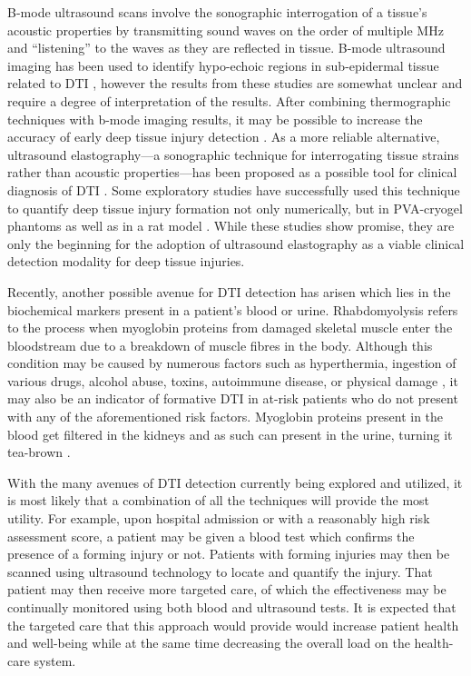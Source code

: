 			B-mode ultrasound scans involve the sonographic interrogation of a tissue's acoustic properties by transmitting sound waves on the order of multiple \si{MHz} and ``listening'' to the waves as they are reflected in tissue. B-mode ultrasound imaging has been used to identify hypo-echoic regions in sub-epidermal tissue related to DTI \cite{andersen08,aoi08,kanno09}, however the results from these studies are somewhat unclear and require a degree of interpretation of the results. After combining thermographic techniques with b-mode imaging results, it may be possible to increase the accuracy of early deep tissue injury detection \cite{higashino12}. As a more reliable alternative, ultrasound elastography---a sonographic technique for interrogating tissue strains rather than acoustic properties---has been proposed as a possible tool for clinical diagnosis of DTI \cite{gehin06,gefen09,gefen13}. Some exploratory studies have successfully used this technique to quantify deep tissue injury formation not only numerically, but in {PVA}-cryogel phantoms as well as in a rat model \cite{deprez07,deprez11}. While these studies show promise, they are only the beginning for the adoption of ultrasound elastography as a viable clinical detection modality for deep tissue injuries.

			Recently, another possible avenue for DTI detection has arisen which lies in the biochemical markers present in a patient's blood or urine. Rhabdomyolysis refers to the process when myoglobin proteins from damaged skeletal muscle enter the bloodstream due to a breakdown of muscle fibres in the body. Although this condition may be caused by numerous factors such as hyperthermia, ingestion of various drugs, alcohol abuse, toxins, autoimmune disease, or physical damage \cite{beetham00,sauret02}, it may also be an indicator of formative DTI in at-risk patients who do not present with any of the aforementioned risk factors. Myoglobin proteins present in the blood get filtered in the kidneys and as such can present in the urine, turning it tea-brown \cite{bagley07}.

			With the many avenues of DTI detection currently being explored and utilized, it is most likely that a combination of all the techniques will provide the most utility. For example, upon hospital admission or with a reasonably high risk assessment score, a patient may be given a blood test which confirms the presence of a forming injury or not. Patients with forming injuries may then be scanned using ultrasound technology to locate and quantify the injury. That patient may then receive more targeted care, of which the effectiveness may be continually monitored using both blood and ultrasound tests. It is expected that the targeted care that this approach would provide would increase patient health and well-being while at the same time decreasing the overall load on the health-care system.


